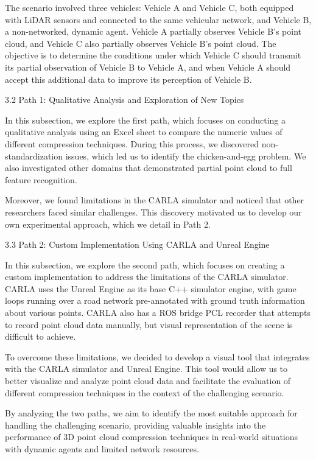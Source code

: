 \documentclass[conference]{IEEEtran}
\begin{document}
The scenario involved three vehicles: Vehicle A and Vehicle C, both equipped with LiDAR sensors and connected to the same vehicular network, and Vehicle B, a non-networked, dynamic agent. Vehicle A partially observes Vehicle B's point cloud, and Vehicle C also partially observes Vehicle B's point cloud. The objective is to determine the conditions under which Vehicle C should transmit its partial observation of Vehicle B to Vehicle A, and when Vehicle A should accept this additional data to improve its perception of Vehicle B.

3.2 Path 1: Qualitative Analysis and Exploration of New Topics

In this subsection, we explore the first path, which focuses on conducting a qualitative analysis using an Excel sheet to compare the numeric values of different compression techniques. During this process, we discovered non-standardization issues, which led us to identify the chicken-and-egg problem. We also investigated other domains that demonstrated partial point cloud to full feature recognition.

Moreover, we found limitations in the CARLA simulator and noticed that other researchers faced similar challenges. This discovery motivated us to develop our own experimental approach, which we detail in Path 2.

3.3 Path 2: Custom Implementation Using CARLA and Unreal Engine

In this subsection, we explore the second path, which focuses on creating a custom implementation to address the limitations of the CARLA simulator. CARLA uses the Unreal Engine as its base C++ simulator engine, with game loops running over a road network pre-annotated with ground truth information about various points. CARLA also has a ROS bridge PCL recorder that attempts to record point cloud data manually, but visual representation of the scene is difficult to achieve.

To overcome these limitations, we decided to develop a visual tool that integrates with the CARLA simulator and Unreal Engine. This tool would allow us to better visualize and analyze point cloud data and facilitate the evaluation of different compression techniques in the context of the challenging scenario.

By analyzing the two paths, we aim to identify the most suitable approach for handling the challenging scenario, providing valuable insights into the performance of 3D point cloud compression techniques in real-world situations with dynamic agents and limited network resources.
\end{document}
